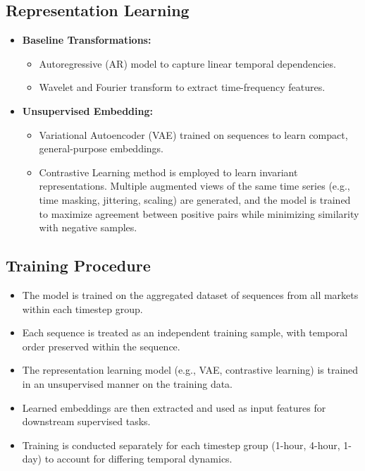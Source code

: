 \subsection*{Representation Learning}


\begin{itemize}[noitemsep]
    \item \textbf{Baseline Transformations:}
    \begin{itemize}[noitemsep]
        \item Autoregressive (AR) model to capture linear temporal dependencies.
        \item Wavelet and Fourier transform to extract time-frequency features.
    \end{itemize}
    \item \textbf{Unsupervised Embedding:} 
    \begin{itemize}[noitemsep]
        \item Variational Autoencoder (VAE) trained on sequences to learn compact, general-purpose embeddings.
        \item Contrastive Learning method is employed to learn invariant representations. Multiple augmented views of the same time series (e.g., time masking, jittering, scaling) are generated, and the model is trained to maximize agreement between positive pairs while minimizing similarity with negative samples. 
    \end{itemize}
\end{itemize}

\subsection*{Training Procedure}
\begin{itemize}[noitemsep]
    \item The model is trained on the aggregated dataset of sequences from all markets within each timestep group.

    \item Each sequence is treated as an independent training sample, with temporal order preserved within the sequence.

    \item The representation learning model (e.g., VAE, contrastive learning) is trained in an unsupervised manner on the training data.

    \item Learned embeddings are then extracted and used as input features for downstream supervised tasks.

    \item Training is conducted separately for each timestep group (1-hour, 4-hour, 1-day) to account for differing temporal dynamics.
\end{itemize}

